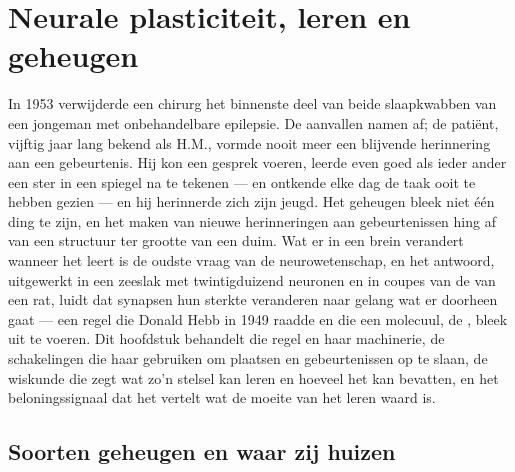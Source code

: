 \chapter{Neurale plasticiteit, leren en geheugen}\label{ch:b3:learning-memory}

In 1953 verwijderde een chirurg het binnenste deel van beide
slaapkwabben van een jongeman met onbehandelbare epilepsie. De
aanvallen namen af; de patiënt, vijftig jaar lang bekend als H.M.,
vormde nooit meer een blijvende herinnering aan een gebeurtenis. Hij
kon een gesprek voeren, leerde even goed als ieder ander een ster in
een spiegel na te tekenen --- en ontkende elke dag de taak ooit te
hebben gezien --- en hij herinnerde zich zijn jeugd. Het geheugen bleek
niet één ding te zijn, en het maken van nieuwe herinneringen aan
gebeurtenissen hing af van een structuur ter grootte van een duim. Wat
er in een brein verandert wanneer het leert is de oudste vraag van de
neurowetenschap, en het antwoord, uitgewerkt in een zeeslak met
twintigduizend neuronen en in coupes van de  van een rat,
luidt dat synapsen hun sterkte veranderen naar gelang wat er doorheen
gaat --- een regel die Donald Hebb in 1949 raadde en die een molecuul,
de , bleek uit te voeren. Dit hoofdstuk behandelt die
regel en haar machinerie, de schakelingen die haar gebruiken om
plaatsen en gebeurtenissen op te slaan, de wiskunde die zegt wat zo'n
stelsel kan leren en hoeveel het kan bevatten, en het beloningssignaal
dat het vertelt wat de moeite van het leren waard is.

\section{Soorten geheugen en waar zij huizen}

